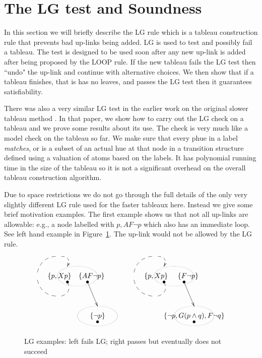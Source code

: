 \documentclass[submission,copyright,creativecommons]{eptcs}
\newcommand{\fut}{F}
\newcommand{\alw}{G}
\newcommand{\nec}{{A}}
\begin{document}
\section{The LG test and Soundness}
\label{sec:lg}

In this section we will 
briefly describe the LG rule which is a tableau construction rule 
that prevents bad up-links being added.
LG
is used to test and possibly fail a tableau.
The test is designed to be used 
soon after any new up-link is
added after being proposed by the LOOP rule.
If the new tableau fails the LG test  then ``undo" the up-link and 
continue with alternative choices.
We then show that if a tableau finishes,
that is has no leaves, and passes the LG test
then it guarantees satisfiability.

There was also a very similar LG test in 
the earlier work on the original slower tableau method
\cite{Rey:startab}.
In that paper,
we show how to carry out the LG check 
on a tableau and we prove some results about
its use. 
The check is very much like a model check on the tableau so far.
We make sure that 
every phue in a label {\em matches},
or is a subset of an actual hue at that node
in a transition structure defined using
a valuation of atoms based on the labels.
It has polynomial running time in the size of the tableau so it is not a 
significant overhead on the overall tableau construction algorithm.

Due to space restrictions we do not go through the full
details of the only very slightly 
different LG rule used for the
faster tableaux here.
Instead we give some brief motivation examples.
The first example shows us that not all up-links are allowable:
e.g., a node labelled with $p, \nec \fut \neg p$ 
which also has an immediate loop.
See left hand example in Figure~\ref{fig:lgnaeg}.
The up-link would not be allowed by the LG rule.


\begin{figure}


\[
\begin{array}{lll}
\xy
(20,50)*\xycircle(10,5){.};
(11,50)*{\{p, Xp\}};
(15,47)*{\bullet};
{\ar @{--} @/^/(15,47)*{};(12,40)*{}};
{\ar@{--} @/^/(9,40)*{};(0,48)*{}};
{\ar@{--} @/^/(0,52)*{};(9,60)*{}};
{\ar@{-->} @/^/(12,60)*{};(15,55)*{}};
(27,50)*{\{AF \neg p \}};
(25,47)*{\bullet};
{\ar(25,47)*{};(30,35)*{}};
(30,30)*\xycircle(10,5){.};
(30,30)*{\{ \neg p\}};
(30,27)*{\bullet};
\endxy
& \mbox{        } &
\xy
(20,50)*\xycircle(10,5){.};
(11,50)*{\{p, Xp\}};
(15,47)*{\bullet};
{\ar @{--} @/^/(15,47)*{};(12,40)*{}};
{\ar@{--} @/^/(9,40)*{};(0,48)*{}};
{\ar@{--} @/^/(0,52)*{};(9,60)*{}};
{\ar@{-->} @/^/(12,60)*{};(15,55)*{}};
(27,50)*{\{F \neg p \}};
(25,47)*{\bullet};
{\ar(25,47)*{};(30,35)*{}};
(30,30)*\xycircle(10,5){.};
(30,30)*{\{ \neg p, \alw (p \wedge q), \fut \neg q\}};
(30,27)*{\bullet};
\endxy
\end{array}
\]

\caption{LG examples: left fails LG; right
passes but eventually does not succeed}

\label{fig:lgnaeg}
\end{figure}
\end{document}
